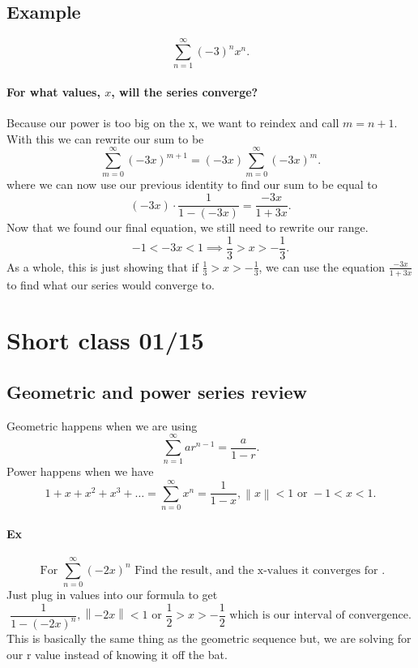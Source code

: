 \subsection{Example}%
\label{sub:Example}
\[
\sum_{ n=1 } ^{ \infty } \left( -3 \right) ^{ n }x^{ n }
.\] 
\paragraph{For what values, $ x $, will the series converge?}
Because our power is too big on the x, we want to reindex and call $ m=n+1 $. With this we can rewrite our sum to be 
\[
\sum_{ m=0 } ^{ \infty } \left( -3x \right) ^{ m+1 }=\left( -3x \right) \sum_{ m=0 } ^{ \infty } \left( -3x \right) ^{ m }
.\] 
where we can now use our previous identity to find our sum to be equal to
\[
	\left( -3x \right) \cdot \frac{ 1 }{ 1-\left( -3x \right)  } = \frac{ -3x }{ 1+3x }
.\] 
Now that we found our final equation, we still need to rewrite our range. 
\[
-1<-3x<1 \implies \frac{ 1 }{ 3 } >x>-\frac{ 1 }{ 3 } 
.\] 
As a whole, this is just showing that if $ \frac{ 1 }{ 3 } >x>-\frac{ 1 }{ 3 }  $, we can use the equation $ \frac{ -3x }{ 1+3x } $ to find what our series would converge to. 

\section{Short class 01/15}%
\label{sec:Short class 01/15}

\subsection{Geometric and power series review}%
\label{sub:Geometric and power series review}

Geometric happens when we are using 
\[
\sum_{ n=1 } ^{ \infty } ar^{ n-1 }=\frac{ a }{ 1-r } 
.\] 
Power happens when we have 
\[
1+x+x^2+x^3+\ldots=\sum_{ n=0 } ^{ \infty } x^{ n }=\frac{ 1 }{ 1-x } ,\left\| x \right\|<1 \text{ or }-1<x<1
.\] 

\paragraph{Ex}%
\label{par:Ex}
\[
\text{ For }\sum_{ n=0 } ^{ \infty } \left( -2x \right) ^{ n }\text{ Find the result, and the x-values it converges for }
.\] 
Just plug in values into our formula to get
\[
\frac{ 1 }{ 1-\left( -2x \right) ^{ n } }, \left\| -2x \right\|<1 \text{ or }\frac{ 1 }{ 2 } >x>-\frac{ 1 }{ 2 } \text{ which is our interval of convergence}
.\] 
This is basically the same thing as the geometric sequence but, we are solving for our r value instead of knowing it off the bat.

